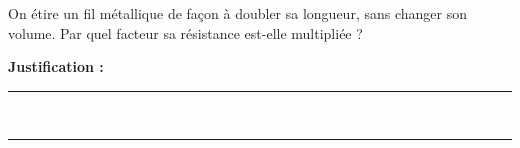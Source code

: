 On étire un fil métallique de façon à doubler sa longueur, sans changer son volume. Par quel facteur sa résistance est-elle multipliée ?

\choices

\noindent\textbf{Justification :} \hrulefill \\[2.5ex]
\rule{\linewidth}{0.4pt} \\[2.5ex]
\rule{\linewidth}{0.4pt}
\vfill
